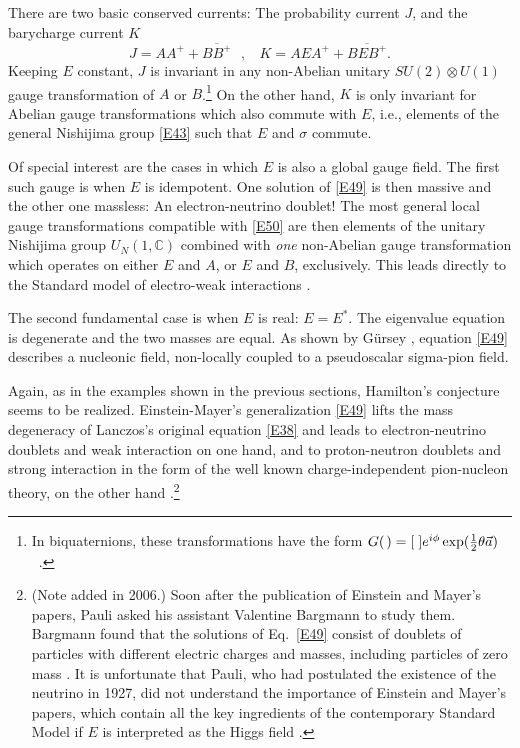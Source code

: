 \documentclass [12pt,a4paper      ]{article}
\newcommand{\bbC}{\mathbb{C}}         %
\newcommand{\CON}{\overline}          %
\newcommand{\Q}{[\hspace{1.mm}]} %
\newcommand{\A}{(\hspace{.5mm})} %
\begin{document}
     There  are  two basic conserved  currents:  The  probability 
current $J$, and the barycharge current $K$
%
\begin{equation}\label{E50}
  J = AA^+   + \CON{BB^+} ~~~, ~~~~ K = AEA^+  + \CON{BEB^+}. %
\end{equation}
%
Keeping $E$ constant, $J$ is invariant in any non-Abelian unitary 
$SU(2) \otimes U(1)$
gauge transformation of $A$ or $B$.\footnote{In biquaternions, these transformations have the form $G\A = \Q e^{i\phi}\exp(\tfrac{1}{2}\theta\vec{a})$~.} On the other 
hand, $K$ is only invariant for Abelian gauge transformations  which 
also commute with $E$, i.e., elements of the general Nishijima group \eqref{E43} such that $E$ and $\sigma$ commute. 

     Of  special  interest  are the cases in which $E$ is  also  a 
global gauge field. The first such gauge is when $E$ is idempotent. 
One solution of \eqref{E49} is then massive and the other one  massless: 
An  electron-neutrino  doublet!  The  most  general  local  gauge 
transformations  compatible  with \eqref{E50} are then elements of the  unitary  Nishijima 
group  $ U_N(1,\bbC)$ combined with \emph{one} non-Abelian gauge transformation  which 
operates on either $E$ and $A$, or $E$ and $B$, exclusively.  This  leads 
directly to the Standard model of electro-weak interactions \cite{R37}.

     The second fundamental case is when $E$ is real: $E = E^*$. The eigenvalue equation is degenerate and the two masses are equal.  As shown by G\"ursey \cite{R32}, 
equation \eqref{E49} describes a nucleonic field,  non-locally coupled to 
a pseudoscalar sigma-pion field.

     Again, as in the examples shown in the previous sections, Hamilton's  
conjecture seems to be realized.  Einstein-Mayer's generalization \eqref{E49} lifts 
the  mass degeneracy of Lanczos's original equation \eqref{E38} and leads 
to  electron-neutrino doublets and weak interaction on one  hand, 
and to proton-neutron doublets and strong interaction in the form 
of the well known charge-independent pion-nucleon theory,  on the 
other hand \cite{R27}.\footnote{(Note added in 2006.) Soon after the publication of Einstein and Mayer's papers, Pauli asked his assistant Valentine Bargmann to study them.  Bargmann found that the solutions of Eq.~\eqref{E49} consist of doublets of particles with different electric charges and masses, including particles of zero mass \cite{BARGM1934-}.  It is unfortunate that Pauli, who had postulated the existence of the neutrino in 1927, did not understand the importance of Einstein and Mayer's papers, which contain all the key ingredients of the contemporary Standard Model if $E$ is interpreted as the Higgs field \cite{R60}.}
\end{document}
